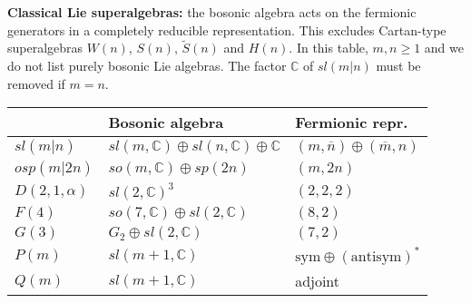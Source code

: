 \documentclass[10pt,letterpaper]{article}
\renewcommand{\paragraph}[1]{\textbf{#1}}
\begin{document}
\paragraph{Classical Lie superalgebras:}
the bosonic algebra acts on the fermionic generators in a completely reducible representation.
This excludes Cartan-type superalgebras $W(n)$, $S(n)$, $\tilde S(n)$ and $H(n)$.
In this table, $m,n\geq 1$ and we do not list purely bosonic Lie algebras.
The factor $\mathbb{C}$ of $sl(m|n)$ must be removed if $m=n$.
\begin{center}
\vspace{-.5\baselineskip}
\begin{tabular}{lll}\toprule
& Bosonic algebra & Fermionic repr. \\\midrule
$sl(m|n)$ & $sl(m,\mathbb{C})\oplus sl(n,\mathbb{C})\oplus\mathbb{C}$ & $(m,\overline{n})\oplus(\overline{m},n)$ \\
$osp(m|2n)$ & $so(m,\mathbb{C}) \oplus sp(2n)$ & $(m,2n)$ \\
$D(2,1,\alpha)$ & $sl(2,\mathbb{C})^3$ & $(2,2,2)$ \\
$F(4)$ & $so(7,\mathbb{C})\oplus sl(2,\mathbb{C})$ & $(8,2)$ \\
$G(3)$ & $G_2\oplus sl(2,\mathbb{C})$ & $(7,2)$ \\
$P(m)$ & $sl(m+1,\mathbb{C})$ & $\text{sym}\oplus(\text{antisym})^*$ \\
$Q(m)$ & $sl(m+1,\mathbb{C})$ & adjoint\\
\bottomrule
\end{tabular}
\end{center}
\end{document}
